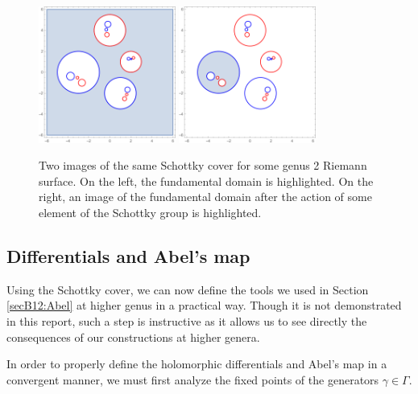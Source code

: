 \begin{figure}
    \center
    \includegraphics[width=0.4\textwidth]{assetsB12/Genus2SchottkyOuter.png}
    \includegraphics[width=0.4\textwidth]{assetsB12/Genus2SchottkyInner.png}
    \caption{
        Two images of the same Schottky cover for some genus 2 Riemann surface.
        On the left, the fundamental domain is highlighted.
        On the right, an image of the fundamental domain after the action of some element of the Schottky group is highlighted.
    }
    \label{figB12:SchottkyIntuition2}
\end{figure}

\subsection{Differentials and Abel's map}\label{secB12:SchottkyDifAndAbel}

Using the Schottky cover, we can now define the tools we used in Section \ref{secB12:Abel} at higher genus in a practical way.
Though it is not demonstrated in this report, such a step is instructive as it allows us to see directly the consequences of our constructions at higher genera.

In order to properly define the holomorphic differentials and Abel's map in a convergent manner, we must first analyze the fixed points of the generators $\gamma \in \Gamma$.

